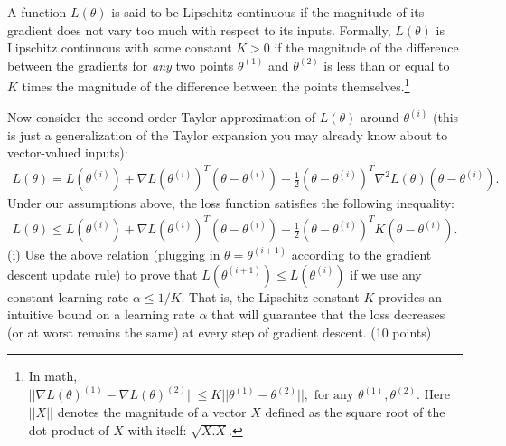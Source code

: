 \documentclass[letterpaper, 11pt]{article}
\newcommand{\problemAnswer}[1]{%
	\noindent\framebox[0.95\columnwidth][c]{\begin{minipage}{0.92\columnwidth}\color{blue}{#1}\end{minipage}} %
}
\begin{document}
{{A function $L(\theta)$ is said to be Lipschitz continuous if the magnitude of its gradient does not vary too much with respect to its inputs. Formally, $L(\theta)$ is Lipschitz continuous with some constant $K>0$ if the magnitude of the difference between the gradients for \emph{any} two points $\theta^{(1)}$ and $\theta^{(2)}$ is less than or equal to $K$ times the magnitude of the difference between the points themselves.\footnote{In math, $
	\lvert\lvert \nabla L(\theta)^{(1)} - \nabla L(\theta)^{(2)} \rvert\rvert \leq K \lvert\lvert \theta^{(1)} - \theta^{(2)} \rvert\rvert, \text{ for any } \theta^{(1)}, \theta^{(2)}.$ Here  $\lvert\lvert X\rvert\rvert$ denotes the magnitude of a vector $X$ defined as the square root of the dot product of $X$ with itself: $\sqrt{X.X}$.}

Now consider the second-order Taylor approximation of $L(\theta)$ around $\theta^{(i)}$  (this is just a generalization of the Taylor expansion you may already know about to vector-valued inputs):
%
\begin{align*}
	L(\theta) = L(\theta^{(i)}) +  \nabla L(\theta^{(i)})^T(\theta - \theta^{(i)}) + \frac{1}{2} (\theta - \theta^{(i)})^T \nabla^2 L(\theta) (\theta - \theta^{(i)}).
\end{align*}
%
Under our assumptions above, the loss function satisfies the following inequality:
\begin{align*}
	L(\theta) \leq L(\theta^{(i)}) +  \nabla L(\theta^{(i)})^T(\theta - \theta^{(i)}) + \frac{1}{2} (\theta - \theta^{(i)})^T K (\theta - \theta^{(i)}).
\end{align*}
%
(i) Use the above relation (plugging in $\theta=\theta^{(i+1)}$ according to the gradient descent update rule) to prove that $L(\theta^{(i+1)}) \leq L(\theta^{(i)})$ if we use any constant learning rate $\alpha \leq 1/K$. That is, the Lipschitz constant $K$ provides an intuitive bound on a learning rate $\alpha$ that will guarantee that the loss decreases (or at worst remains the same) at every step of gradient descent. (10 points)

\problemAnswer{
	Write your answer here.
	
}}}
\end{document}
